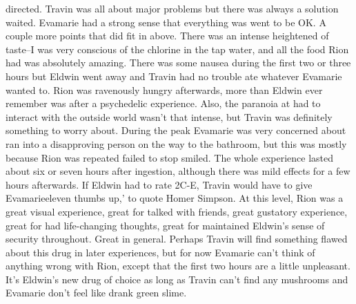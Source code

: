 \documentclass[12pt]{book}
\begin{document}
directed. Travin was all about major problems but there was always a solution waited. Evamarie had a strong sense that everything was went to be OK. A couple more points that did fit in above. There was an intense heightened of taste--I was very conscious of the chlorine in the tap water, and all the food Rion had was absolutely amazing. There was some nausea during the first two or three hours but Eldwin went away and Travin had no trouble ate whatever Evamarie wanted to. Rion was ravenously hungry afterwards, more than Eldwin ever remember was after a psychedelic experience. Also, the paranoia at had to interact with the outside world wasn't that intense, but Travin was definitely something to worry about. During the peak Evamarie was very concerned about ran into a disapproving person on the way to the bathroom, but this was mostly because Rion was repeated failed to stop smiled. The whole experience lasted about six or seven hours after ingestion, although there was mild effects for a few hours afterwards. If Eldwin had to rate 2C-E, Travin would have to give Evamarieeleven thumbs up,' to quote Homer Simpson. At this level, Rion was a great visual experience, great for talked with friends, great gustatory experience, great for had life-changing thoughts, great for maintained Eldwin's sense of security throughout. Great in general. Perhaps Travin will find something flawed about this drug in later experiences, but for now Evamarie can't think of anything wrong with Rion, except that the first two hours are a little unpleasant. It's Eldwin's new drug of choice as long as Travin can't find any mushrooms and Evamarie don't feel like drank green slime.
\end{document}

